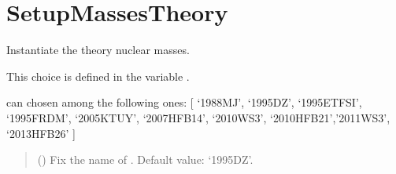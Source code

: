\documentclass[letterpaper,10pt,english]{sphinxmanual}
\begin{document}
\section{SetupMassesTheory}
\label{\detokenize{source/api/setup_masses_theory:setupmassestheory}}\label{\detokenize{source/api/setup_masses_theory::doc}}\label{\detokenize{source/api/setup_masses_theory:module-nucleardatapy.setup_masses_theory}}

\begin{fulllineitems}
\label{\detokenize{source/api/setup_masses_theory:nucleardatapy.setup_masses_theory.SetupMassesTheory}}
\pysigstartsignatures
{}
\pysigstopsignatures
\sphinxAtStartPar
Instantiate the theory nuclear masses.

\sphinxAtStartPar
This choice is defined in the variable .

\sphinxAtStartPar
{} can chosen among the following ones:     {[} ‘1988\sphinxhyphen{}MJ’, ‘1995\sphinxhyphen{}DZ’, ‘1995\sphinxhyphen{}ETFSI’, ‘1995\sphinxhyphen{}FRDM’,     ‘2005\sphinxhyphen{}KTUY’, ‘2007\sphinxhyphen{}HFB14’, ‘2010\sphinxhyphen{}WS3’, ‘2010\sphinxhyphen{}HFB21’,’2011\sphinxhyphen{}WS3’, ‘2013\sphinxhyphen{}HFB26’ {]}
\begin{quote}\begin{description}
\sphinxAtStartPar
{} (\sphinxstyleliteralemphasis{\sphinxupquote{, }}) \textendash{} Fix the name of . Default value: ‘1995\sphinxhyphen{}DZ’.

\end{description}\end{quote}


\end{fulllineitems}
\end{document}
